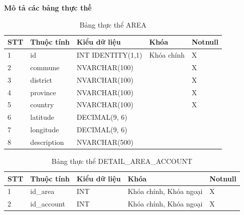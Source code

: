 \documentclass[../DoAn.tex]{subfiles}
\begin{document}
\textbf{Mô tả các bảng thực thế}
\begin{table}[H]
	\centering{}
	\begin{tabular}{m{1cm} m{4cm} m{3.5cm} m{3cm} m{1.5cm}}
		\hline
		\textbf{STT} & \textbf{Thuộc tính} & \textbf{Kiểu dữ liệu} & \textbf{Khóa} & \textbf{Notnull}
		\\ \hline
		1            & id                  & INT IDENTITY(1,1)     & Khóa chính    & X
		\\ \hline
		2            & commune             & NVARCHAR(100)         &               & X
		\\ \hline
		3            & district            & NVARCHAR(100)         &               & X
		\\ \hline
		4            & province            & NVARCHAR(100)         &               & X
		\\ \hline
		5            & country             & NVARCHAR(100)         &               & X
		\\ \hline
		6            & latitude            & DECIMAL(9, 6)         &               &
		\\ \hline
		7            & longitude           & DECIMAL(9, 6)         &               &
		\\ \hline
		8            & description         & NVARCHAR(500)         &               &
		\\ \hline
	\end{tabular}
	\caption{Bảng thực thể AREA}
\end{table}

\begin{table}[H]
	\centering{}
	\begin{tabular}{m{1cm} m{4cm} m{3.5cm} m{3cm} m{1.5cm}}
		\hline
		\textbf{STT} & \textbf{Thuộc tính} & \textbf{Kiểu dữ liệu} & \textbf{Khóa}          & \textbf{Notnull}
		\\ \hline
		1            & id\_area            & INT                   & Khóa chính, Khóa ngoại & X
		\\ \hline
		2            & id\_account         & INT                   & Khóa chính, Khóa ngoại & X
		\\ \hline
	\end{tabular}
	\caption{Bảng thực thể DETAIL\_AREA\_ACCOUNT}
\end{table}
\end{document}
